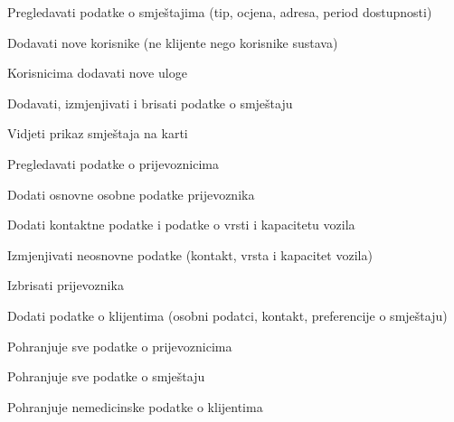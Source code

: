 			
			\begin{packed_enum}
				\item  {}
				
				\begin{packed_enum}
					
					\item Pregledavati podatke o smještajima (tip, ocjena, adresa, period dostupnosti)
					\item Dodavati nove korisnike (ne klijente nego korisnike sustava)
					\item Korisnicima dodavati nove uloge
					\item Dodavati, izmjenjivati i brisati podatke o smještaju
					\item Vidjeti prikaz smještaja na karti
					
				\end{packed_enum}
				\eject
				
					\item  {}
				
				\begin{packed_enum}
					
					\item Pregledavati podatke o prijevoznicima
					\item Dodati osnovne osobne podatke prijevoznika
					\item Dodati kontaktne podatke i podatke o vrsti i kapacitetu vozila
					\item Izmjenjivati neosnovne podatke (kontakt, vrsta i kapacitet vozila)
					\item Izbrisati prijevoznika

				\end{packed_enum}
				
					\item  {}
				
				\begin{packed_enum}
					
					\item Dodati podatke o klijentima (osobni podatci, kontakt, preferencije o smještaju)
					
				\end{packed_enum}
			
				\item  {}
				
				\begin{packed_enum}
					
					\item Pohranjuje sve podatke o prijevoznicima
					\item Pohranjuje sve podatke o smještaju
					\item Pohranjuje nemedicinske podatke o klijentima
					
				\end{packed_enum}
				
					
			\end{packed_enum}
			
